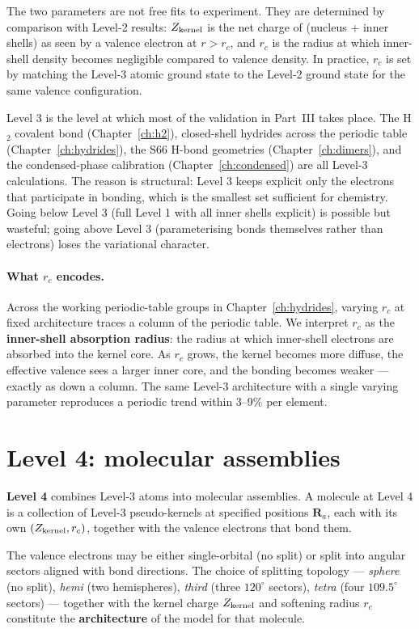The two parameters are not free fits to experiment. They are determined by comparison with Level-2 results: $Z_{\rm kernel}$ is the net charge of (nucleus + inner shells) as seen by a valence electron at $r > r_c$, and $r_c$ is the radius at which inner-shell density becomes negligible compared to valence density. In practice, $r_c$ is set by matching the Level-3 atomic ground state to the Level-2 ground state for the same valence configuration.

Level 3 is the level at which most of the validation in Part~III takes place. The H$_2$ covalent bond (Chapter~\ref{ch:h2}), closed-shell hydrides across the periodic table (Chapter~\ref{ch:hydrides}), the S66 H-bond geometries (Chapter~\ref{ch:dimers}), and the condensed-phase calibration (Chapter~\ref{ch:condensed}) are all Level-3 calculations. The reason is structural: Level 3 keeps explicit only the electrons that participate in bonding, which is the smallest set sufficient for chemistry. Going below Level 3 (full Level 1 with all inner shells explicit) is possible but wasteful; going above Level 3 (parameterising bonds themselves rather than electrons) loses the variational character.

\paragraph{What $r_c$ encodes.} Across the working periodic-table groups in Chapter~\ref{ch:hydrides}, varying $r_c$ at fixed architecture traces a column of the periodic table. We interpret $r_c$ as the \textbf{inner-shell absorption radius}: the radius at which inner-shell electrons are absorbed into the kernel core. As $r_c$ grows, the kernel becomes more diffuse, the effective valence sees a larger inner core, and the bonding becomes weaker --- exactly as down a column. The same Level-3 architecture with a single varying parameter reproduces a periodic trend within 3--9\% per element.

\section{Level 4: molecular assemblies}\label{sec:level4}

\textbf{Level 4} combines Level-3 atoms into molecular assemblies. A molecule at Level 4 is a collection of Level-3 pseudo-kernels at specified positions $\mathbf{R}_a$, each with its own $(Z_{\rm kernel}, r_c)$, together with the valence electrons that bond them.

The valence electrons may be either single-orbital (no split) or split into angular sectors aligned with bond directions. The choice of splitting topology --- \emph{sphere} (no split), \emph{hemi} (two hemispheres), \emph{third} (three $120^\circ$ sectors), \emph{tetra} (four $109.5^\circ$ sectors) --- together with the kernel charge $Z_{\rm kernel}$ and softening radius $r_c$ constitute the \textbf{architecture} of the model for that molecule.

